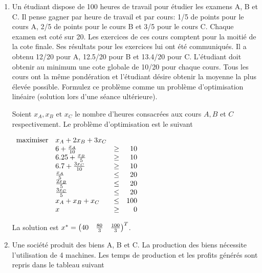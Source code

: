 \begin{enumerate}


  \item Un étudiant dispose de 100 heures de travail pour étudier les examens A, B et C. Il pense gagner par heure de travail et par
    cours: 1/5 de points pour le cours A, 2/5 de points pour le cours B et 3/5 pour le cours C. Chaque examen est coté sur 20. Les
    exercices de ces cours comptent pour la moitié de la cote finale. Ses résultats pour les exercices lui ont été communiqués. Il a
    obtenu 12/20 pour A, 12.5/20 pour B et 13.4/20 pour C.  L'étudiant doit obtenir au minimum une cote globale de 10/20 pour chaque cours. Tous
    les cours ont la même pondération et l'étudiant désire obtenir la  moyenne la plus élevée possible.  Formulez ce problème comme un problème d'optimisation
    linéaire (solution lors d'une séance ultérieure).
    \begin{solution}
      Soient $x_{A}, x_{B}\text{ et }x_{C}$ le nombre d'heures consacrées aux cours $A, B$ et $C$ respectivement.
      Le problème d'optimisation est le suivant

      $
      \begin{array}{llcr}
        \mbox{maximiser} & x_A + 2x_B + 3x_C\\
        & 6 + \frac{x_A}{10} & \geq & 10\\
        & 6.25 + \frac{x_B}{5} & \geq & 10\\
        & 6.7 + \frac{3x_C}{10} & \geq & 10\\
        & \frac{x_A}{5} & \leq & 20\\
        & \frac{2x_B}{5} & \leq & 20\\
        & \frac{3x_C}{5} & \leq & 20\\
        & x_A + x_B + x_C & \leq & 100\\
        & x & \geq & 0
      \end{array}
      $

      La solution est
      $x^* = \begin{pmatrix}
        40 & \frac{80}{3} & \frac{100}{3}
      \end{pmatrix}^{T}$.

    \end{solution}


  \item Une société produit des biens A, B et C. La production des biens nécessite l'utilisation de 4 machines. Les temps de production
    et les profits générés sont repris dans le tableau suivant\\


\end{enumerate}
